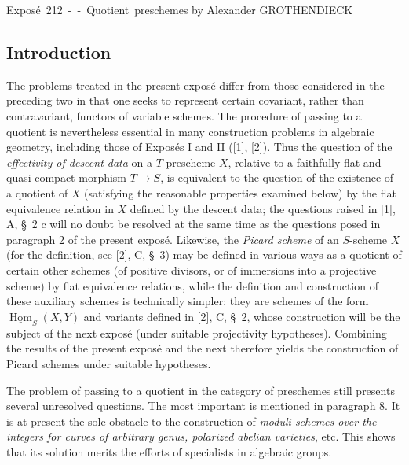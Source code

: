 \unit{Exposé 212 -- Quotient preschemes}
%
  {by Alexander GROTHENDIECK}

\subsection*{Introduction}

The problems treated in the present exposé differ from those considered in
the preceding two in that one seeks to represent certain covariant, rather
than contravariant, functors of variable schemes. The procedure of passing to
a quotient is nevertheless essential in many construction problems in
algebraic geometry, including those of Exposés I and II ([1], [2]). Thus the
question of the \emph{effectivity of descent data} on a $T$-prescheme $X$,
relative to a faithfully flat and quasi-compact morphism
$T\longrightarrow S$, is equivalent to the question of the existence of a
quotient of $X$ (satisfying the reasonable properties examined below) by the
flat equivalence relation in $X$ defined by the descent data; the questions
raised in [1], A, \S~2 c will no doubt be resolved at the same time as the
questions posed in paragraph 2 of the present exposé. Likewise, the
\emph{Picard scheme} of an $S$-scheme $X$ (for the definition, see [2], C,
\S~3) may be defined in various ways as a quotient of certain other schemes
(of positive divisors, or of immersions into a projective scheme) by flat
equivalence relations, while the definition and construction of these
auxiliary schemes is technically simpler: they are schemes of the form
$\underline{\operatorname{Hom}}_S(X,Y)$ and variants defined in [2], C,
\S~2, whose construction will be the subject of the next exposé (under
suitable projectivity hypotheses). Combining the results of the present
exposé and the next therefore yields the construction of Picard schemes under
suitable hypotheses.

The problem of passing to a quotient in the category of preschemes still
presents several unresolved questions. The most important is mentioned in
paragraph 8. It is at present the sole obstacle to the construction of
\emph{moduli schemes over the integers for curves of arbitrary genus,
polarized abelian varieties}, etc. This shows that its solution merits the
efforts of specialists in algebraic groups.

